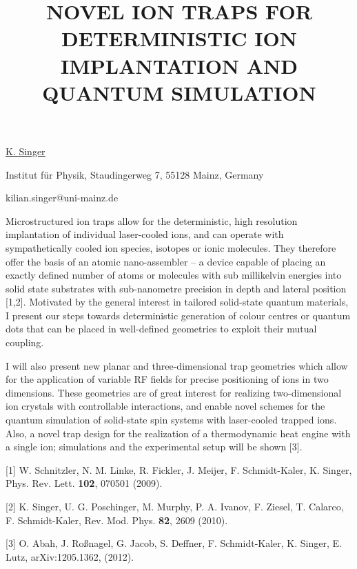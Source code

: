 \title{NOVEL ION TRAPS FOR DETERMINISTIC ION IMPLANTATION AND QUANTUM SIMULATION}

\underline{K. Singer} 

{\normalsize{\vspace{-4mm}}
Institut f\"{u}r Physik, Staudingerweg 7, 55128 Mainz, Germany

\email kilian.singer@uni-mainz.de}

Microstructured ion traps allow for the deterministic, high resolution implantation of individual laser-cooled ions, and can operate with sympathetically cooled ion species, isotopes or ionic molecules. They therefore offer the basis of an atomic nano-assembler -- a device capable of placing an exactly defined number of atoms or molecules with sub millikelvin energies into solid state substrates with sub-nanometre precision in depth and lateral position [1,2]. Motivated by the general interest in tailored solid-state quantum materials, I present our steps towards deterministic generation of colour centres or quantum dots that can be placed in well-defined geometries to exploit their mutual coupling.

I will also present new planar and three-dimensional trap geometries which allow for the application of variable RF fields for precise positioning of ions in two dimensions. These geometries are of great interest for realizing two-dimensional ion crystals with controllable interactions, and enable novel schemes for the quantum simulation of solid-state spin systems with laser-cooled trapped ions. Also, a novel trap design for the realization of a thermodynamic heat engine with a single ion; simulations and the experimental setup will be shown [3].

{\normalsize
[1] W. Schnitzler, N. M. Linke, R. Fickler, J. Meijer, F. Schmidt-Kaler, K. Singer, Phys. Rev. Lett. \textbf{102}, 070501 (2009).
\vsp

[2] K. Singer, U. G. Poschinger, M. Murphy, P. A. Ivanov, F. Ziesel, T. Calarco, F. Schmidt-Kaler, Rev. Mod. Phys. \textbf{82}, 2609 (2010).
\vsp

[3] O. Abah, J. Ro{\ss}nagel, G. Jacob, S. Deffner, F. Schmidt-Kaler, K. Singer, E. Lutz, arXiv:1205.1362, (2012).
}

\vspace{\baselineskip}

